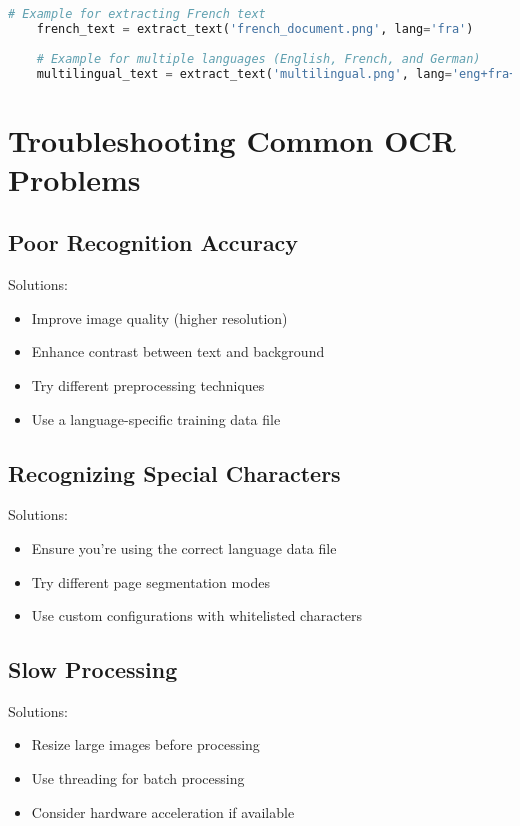 \begin{lstlisting}[language=Python]
	# Example for extracting French text
	french_text = extract_text('french_document.png', lang='fra')
	
	# Example for multiple languages (English, French, and German)
	multilingual_text = extract_text('multilingual.png', lang='eng+fra+deu')
\end{lstlisting}

\section{Troubleshooting Common OCR Problems}

\subsection{Poor Recognition Accuracy}
Solutions:
\begin{itemize}
	\item Improve image quality (higher resolution)
	\item Enhance contrast between text and background
	\item Try different preprocessing techniques
	\item Use a language-specific training data file
\end{itemize}

\subsection{Recognizing Special Characters}
Solutions:
\begin{itemize}
	\item Ensure you're using the correct language data file
	\item Try different page segmentation modes
	\item Use custom configurations with whitelisted characters
\end{itemize}

\subsection{Slow Processing}
Solutions:
\begin{itemize}
	\item Resize large images before processing
	\item Use threading for batch processing
	\item Consider hardware acceleration if available
\end{itemize}

